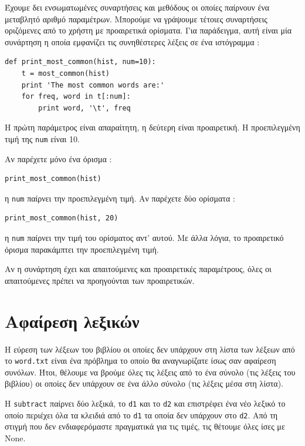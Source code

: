 \documentclass[10pt]{book}
\begin{document}
Έχουμε δει ενσωματωμένες συναρτήσεις και μεθόδους οι οποίες παίρνουν ένα μεταβλητό αριθμό παραμέτρων. 
Μπορούμε να γράψουμε τέτοιες συναρτήσεις οριζόμενες από το χρήστη με προαιρετικά ορίσματα. Για παράδειγμα, αυτή είναι 
μία συνάρτηση η οποία εμφανίζει τις συνηθέστερες λέξεις σε ένα ιστόγραμμα :

\begin{verbatim}
def print_most_common(hist, num=10):
    t = most_common(hist)
    print 'The most common words are:'
    for freq, word in t[:num]:
        print word, '\t', freq
\end{verbatim}

 Η πρώτη παράμετρος είναι απαραίτητη, η δεύτερη είναι προαιρετική. Η προεπιλεγμένη τιμή της  {\tt num}  είναι 10.

Αν παρέχετε μόνο ένα όρισμα :

\begin{verbatim}
print_most_common(hist)
\end{verbatim}

 η  {\tt num}  παίρνει την προεπιλεγμένη τιμή. Αν παρέχετε δύο ορίσματα :

\begin{verbatim}
print_most_common(hist, 20)
\end{verbatim}

 η  {\tt num}  παίρνει την τιμή του ορίσματος αντ' αυτού. Με άλλα λόγια, το προαιρετικό όρισμα παρακάμπτει την προεπιλεγμένη τιμή.

Αν η συνάρτηση έχει και απαιτούμενες και προαιρετικές παραμέτρους, όλες οι απαιτούμενες πρέπει να προηγούνται των προαιρετικών.


\section{Αφαίρεση λεξικών}

Η εύρεση των λέξεων του βιβλίου οι οποίες δεν υπάρχουν στη λίστα των λέξεων από το  {\tt word.txt}  είναι ένα 
πρόβλημα το οποίο θα αναγνωρίζατε ίσως σαν αφαίρεση συνόλων. Ήτοι, θέλουμε να βρούμε όλες τις λέξεις από το ένα σύνολο (τις λέξεις του βιβλίου) οι οποίες δεν υπάρχουν σε ένα άλλο σύνολο (τις λέξεις μέσα στη λίστα). 

 Η  {\tt subtract}  παίρνει δύο λεξικά, το  {\tt d1}  και το  {\tt d2}  και επιστρέφει ένα νέο λεξικό 
το οποίο περιέχει όλα τα κλειδιά από το  {\tt d1}  τα οποία δεν υπάρχουν στο  {\tt d2}.  Από τη στιγμή που δεν ενδιαφερόμαστε πραγματικά για τις τιμές, τις θέτουμε όλες ίσες με  None.
\end{document}
